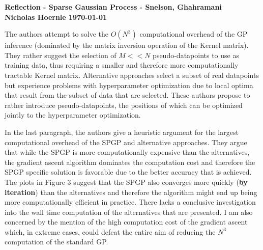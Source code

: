 \documentclass[twoside]{article}
\begin{document}
\textbf{Reflection - Sparse Gaussian Process - Snelson, Ghahramani}\\
\textbf{Nicholas Hoernle \hfill \today}

The authors attempt to solve the $O(N^3)$ computational overhead of the GP inference (dominated by the matrix inversion operation of the Kernel matrix). They rather suggest the selection of $M << N$ pseudo-datapoints to use as training data, thus requiring a smaller and therefore more computationally tractable Kernel matrix. Alternative approaches select a subset of real datapoints but experience problems with hyperparameter optimization due to local optima that result from the subset of data that are selected. These authors propose to rather introduce pseudo-datapoints, the positions of which can be optimized jointly to the hyperparameter optimization.

In the last paragraph, the authors give a heuristic argument for the largest computational overhead of the SPGP and alternative approaches. They argue that while the SPGP is more computationally expensive than the alternatives, the gradient ascent algorithm dominates the computation cost and therefore the SPGP specific solution is favorable due to the better accuracy that is achieved. The plots in Figure 3 suggest that the SPGP also converges more quickly (\textbf{by iteration}) than the alternatives and therefore the algorithm might end up being more computationally efficient in practice. There lacks a conclusive investigation into the wall time computation of the alternatives that are presented. I am also concerned by the mention of the high computation cost of the gradient ascent which, in extreme cases, could defeat the entire aim of reducing the $N^3$ computation of the standard GP.
\end{document}
